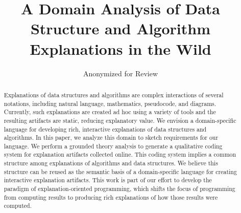 \documentclass[sigconf]{acmart}
\begin{document}
\title{A Domain Analysis of Data Structure and Algorithm Explanations in the Wild}


\author{Anonymized for Review}
\affiliation{
  \institution{\phantom{Anonymous}}
  \department{\phantom{Anonymous}}
  \city{\phantom{Anonymous}}
  \state{\phantom{Anonymous}}
  \country{\phantom{Anonymous}}
}

\begin{abstract}
%
Explanations of data structures and algorithms are complex interactions of
several notations, including natural language, mathematics, pseudocode, and
diagrams. Currently, such explanations are created ad hoc using a variety of
tools and the resulting artifacts are static, reducing explanatory value. We
envision a domain-specific language for developing rich, interactive
explanations of data structures and algorithms. In this paper, we analyze this
domain to sketch requirements for our language. We perform a grounded theory
analysis to generate a qualitative coding system for explanation artifacts
collected online. This coding system implies a common structure among
explanations of algorithms and data structures. We believe this structure can
be reused as the semantic basis of a domain-specific language for creating
interactive explanation artifacts. This work is part of our effort to develop
the paradigm of explanation-oriented programming, which shifts the focus of
programming from computing results to producing rich explanations of how those
results were computed.
%
\end{abstract}

%
%



\end{document}

